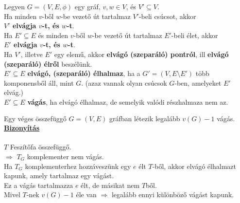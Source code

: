 \documentclass{beamer}
\newcommand{\msmallskip}{\vspace{0.3em}}
\newcommand{\mmedskip}{\vspace{0.5em}}
\newcommand{\mbigskip}{\vspace{1em}}
\begin{document}
\begin{frame}
\begin{tcolorbox}[title={Elvágó élhalmaz, vágás}]
Legyen $G =  (V, E, {\phi})$ egy gráf, $v, w \in V$, és $V' \subseteq V$.\\
\mbigskip
Ha minden $v$-ből $w$-be vezető út tartalmaz $V'$-beli csúcsot, akkor\\
\mmedskip
\textbf{$V'$ elvágja $v$-t, és $w$-t}.\\
\mmedskip
Ha $E' \subseteq E$ és minden $v$-ből $w$-be vezető út tartalmaz $E'$-beli élet, akkor\\
\mmedskip
\textbf{$E'$ elvágja $v$-t, és $w$-t}.\\
\mbigskip
Ha $V'$, illetve $E'$ egy elemű, akkor \textbf{elvágó (szeparáló) pontról}, ill \textbf{elvágó (szeparáló) élről} beszélünk.\\
\mbigskip
$E' \subseteq E$ \textbf{elvágó, (szeparáló) élhalmaz}, ha a $G' = (V, E \setminus E')$ több komponensből áll, mint $G$. (azaz vannak olyan csúcsok $G$-ben, amelyeket $E'$ elvág.)\\
\mbigskip
$E' \subseteq E$ \textbf{vágás}, ha elvágó élhalmaz, de semelyik  valódi részhalmaza nem az.
\end{tcolorbox}
\end{frame}

\begin{frame}
\begin{tcolorbox}[title={Tétel: Vágások száma}]
Egy véges összefüggő $G = (V, E)$ gráfban létezik legalább $v(G) - 1$ vágás.\\
\tcblower
\msmallskip
\underline{\textbf{Bizonyítás}}\\
\mmedskip
\\
$T$ Feszítőfa összefüggő.\\
$\Rightarrow$ $T_G$ komplementer nem vágás.\\
Ha $T_G$ komplementerhez hozzáveszünk egy $e$ élt $T$-ből, akkor elvágó élhalmazt kapunk, amely tartalmaz egy vágást.\\
Ez a vágás tartalmazza $e$ élt, de másikat nem $T$ből.\\
Mivel $T$-nek $v(G) - 1$ éle van $\Rightarrow$ legalább ennyi különböző vágást kapunk.
\end{tcolorbox}
\end{frame}
\end{document}
